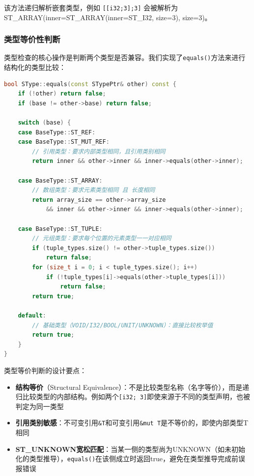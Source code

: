 \documentclass[12pt,a4paper]{ctexart}
\begin{document}
该方法递归解析嵌套类型，例如 \texttt{[[i32;3];3]} 会被解析为 ST\_ARRAY(inner=ST\_ARRAY(inner=ST\_I32, size=3), size=3)。

\subsubsection{类型等价性判断}

类型检查的核心操作是判断两个类型是否兼容。我们实现了\texttt{equals()}方法来进行结构化的类型比较：

\begin{lstlisting}[language=C++, caption={类型等价性判断}]
bool SType::equals(const STypePtr& other) const {
    if (!other) return false;
    if (base != other->base) return false;

    switch (base) {
    case BaseType::ST_REF:
    case BaseType::ST_MUT_REF:
        // 引用类型：要求内部类型相同，且引用类别相同
        return inner && other->inner && inner->equals(other->inner);

    case BaseType::ST_ARRAY:
        // 数组类型：要求元素类型相同 且 长度相同
        return array_size == other->array_size
            && inner && other->inner && inner->equals(other->inner);

    case BaseType::ST_TUPLE:
        // 元组类型：要求每个位置的元素类型一一对应相同
        if (tuple_types.size() != other->tuple_types.size())
            return false;
        for (size_t i = 0; i < tuple_types.size(); i++)
            if (!tuple_types[i]->equals(other->tuple_types[i]))
                return false;
        return true;

    default:
        // 基础类型（VOID/I32/BOOL/UNIT/UNKNOWN）：直接比较枚举值
        return true;
    }
}
\end{lstlisting}

类型等价判断的设计要点：
\begin{itemize}
    \item \textbf{结构等价}（Structural Equivalence）：不是比较类型名称（名字等价），而是递归比较类型的内部结构。例如两个\texttt{[i32; 3]}即使来源于不同的类型声明，也被判定为同一类型
    \item \textbf{引用类别敏感}：不可变引用\texttt{\&T}和可变引用\texttt{\&mut T}是不等价的，即使内部类型T相同
    \item \textbf{ST\_UNKNOWN宽松匹配}：当某一侧的类型尚为UNKNOWN（如未初始化的类型推导），\texttt{equals()}在该侧成立时返回true，避免在类型推导完成前误报错误
\end{itemize}
\end{document}
